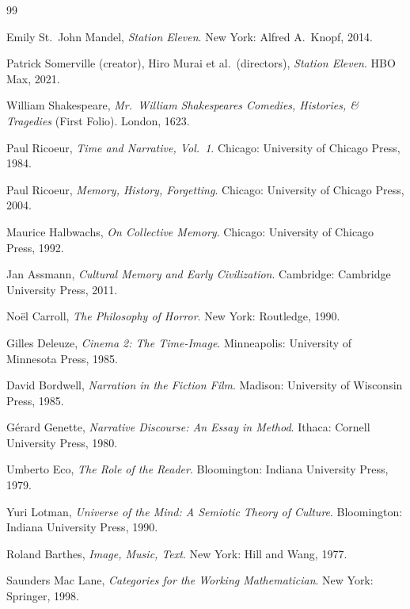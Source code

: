 \documentclass[12pt, oneside]{article}
\theoremstyle{plain}
\theoremstyle{definition}
\theoremstyle{remark}
\begin{document}
\newpage
\begin{thebibliography}{99}

Emily St.\ John Mandel,
\textit{Station Eleven}.
New York: Alfred A.\ Knopf, 2014.

Patrick Somerville (creator), Hiro Murai et al.\ (directors),
\textit{Station Eleven}.
HBO Max, 2021.

William Shakespeare,
\textit{Mr.\ William Shakespeares Comedies, Histories, \& Tragedies}
(First Folio).
London, 1623.

Paul Ricoeur,
\textit{Time and Narrative, Vol.\ 1}.
Chicago: University of Chicago Press, 1984.

Paul Ricoeur,
\textit{Memory, History, Forgetting}.
Chicago: University of Chicago Press, 2004.

Maurice Halbwachs,
\textit{On Collective Memory}.
Chicago: University of Chicago Press, 1992.

Jan Assmann,
\textit{Cultural Memory and Early Civilization}.
Cambridge: Cambridge University Press, 2011.

No\"{e}l Carroll,
\textit{The Philosophy of Horror}.
New York: Routledge, 1990.

Gilles Deleuze,
\textit{Cinema 2: The Time-Image}.
Minneapolis: University of Minnesota Press, 1985.

David Bordwell,
\textit{Narration in the Fiction Film}.
Madison: University of Wisconsin Press, 1985.

G\'{e}rard Genette,
\textit{Narrative Discourse: An Essay in Method}.
Ithaca: Cornell University Press, 1980.

Umberto Eco,
\textit{The Role of the Reader}.
Bloomington: Indiana University Press, 1979.

Yuri Lotman,
\textit{Universe of the Mind: A Semiotic Theory of Culture}.
Bloomington: Indiana University Press, 1990.

Roland Barthes,
\textit{Image, Music, Text}.
New York: Hill and Wang, 1977.

Saunders Mac Lane,
\textit{Categories for the Working Mathematician}.
New York: Springer, 1998.


\end{thebibliography}
\end{document}
